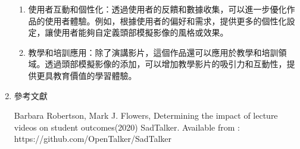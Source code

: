\documentclass[12pt]{article}
\begin{document}
\begin{enumerate}
\begin{enumerate}
      \item 使用者互動和個性化：透過使用者的反饋和數據收集，可以進一步優化作品的使用者體驗。例如，根據使用者的偏好和需求，提供更多的個性化設定，讓使用者能夠自定義頭部模擬影像的風格或效果。
      \item 教學和培訓應用：除了演講影片，這個作品還可以應用於教學和培訓領域。透過頭部模擬影像的添加，可以增加教學影片的吸引力和互動性，提供更具教育價值的學習體驗。
    \end{enumerate}
  \item 參考文獻
    \renewcommand{\section}[2]{}
    \begin{thebibliography}{99}
       Barbara Robertson, Mark J. Flowers, Determining the impact of lecture videos on student outcomes(2020)
      	SadTalker. Available from :  https://github.com/OpenTalker/SadTalker
    \end{thebibliography}
\end{enumerate}
\end{document}
